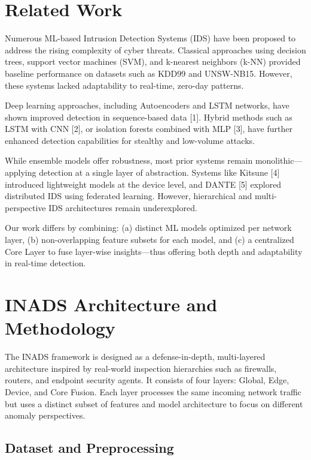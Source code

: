 \documentclass[conference]{IEEEtran}
\begin{document}
\section{Related Work}

Numerous ML-based Intrusion Detection Systems (IDS) have been proposed to address the rising complexity of cyber threats. Classical approaches using decision trees, support vector machines (SVM), and k-nearest neighbors (k-NN) provided baseline performance on datasets such as KDD99 and UNSW-NB15. However, these systems lacked adaptability to real-time, zero-day patterns.

Deep learning approaches, including Autoencoders and LSTM networks, have shown improved detection in sequence-based data [1]. Hybrid methods such as LSTM with CNN [2], or isolation forests combined with MLP [3], have further enhanced detection capabilities for stealthy and low-volume attacks.

While ensemble models offer robustness, most prior systems remain monolithic—applying detection at a single layer of abstraction. Systems like Kitsune [4] introduced lightweight models at the device level, and DANTE [5] explored distributed IDS using federated learning. However, hierarchical and multi-perspective IDS architectures remain underexplored.

Our work differs by combining: (a) distinct ML models optimized per network layer, (b) non-overlapping feature subsets for each model, and (c) a centralized Core Layer to fuse layer-wise insights—thus offering both depth and adaptability in real-time detection.

\section{INADS Architecture and Methodology}

The INADS framework is designed as a defense-in-depth, multi-layered architecture inspired by real-world inspection hierarchies such as firewalls, routers, and endpoint security agents. It consists of four layers: Global, Edge, Device, and Core Fusion. Each layer processes the same incoming network traffic but uses a distinct subset of features and model architecture to focus on different anomaly perspectives.

\subsection{Dataset and Preprocessing}
\end{document}

